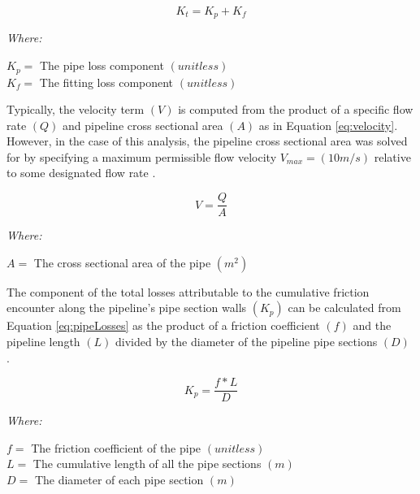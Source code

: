        \begin{equation}
           K_{t} = K_{p} + K_{f}
           \label{eq:totalLosses}
       \end{equation}
       
       \noindent \textit{Where:} \hfill
       
       \begin{center}
           $K_p = $ The pipe loss component $(unitless)$ \\
           $K_f = $ The fitting loss component $(unitless)$ \\
       \end{center}       
       
Typically, the velocity term $(V)$ is computed from the product of a specific flow rate $(Q)$ and pipeline cross sectional area $(A)$ as in Equation \ref{eq:velocity}. However, in the case of this analysis, the pipeline cross sectional area was solved for by specifying a maximum permissible flow velocity $V_{max} = (10 m/s)$ relative to some designated flow rate \cite{Liu2003}.
       
       \begin{equation}
           V = \frac{Q}{A}
           \label{eq:velocity}
       \end{equation}
       
       \noindent \textit{Where:} \hfill
       
       \begin{center}
           $A = $ The cross sectional area of the pipe $(m^2)$\\
       \end{center}      
       
The component of the total losses attributable to the cumulative friction encounter along the pipeline's pipe section walls $(K_p)$ can be calculated from Equation \ref{eq:pipeLosses} as the product of a friction coefficient $(f)$ and the pipeline length $(L)$ divided by the diameter of the pipeline pipe sections $(D)$ \cite{Liu2003}.
       
       \begin{equation}
           K_{p} = \frac{f * L}{D}
           \label{eq:pipeLosses}
       \end{equation}
       
       \noindent \textit{Where:} \hfill
       
       \begin{center}
           $f = $ The friction coefficient of the pipe $(unitless)$ \\
           $L = $ The cumulative length of all the pipe sections $(m)$ \\
           $D = $ The diameter of each pipe section $(m)$ \\
       \end{center}   
       
